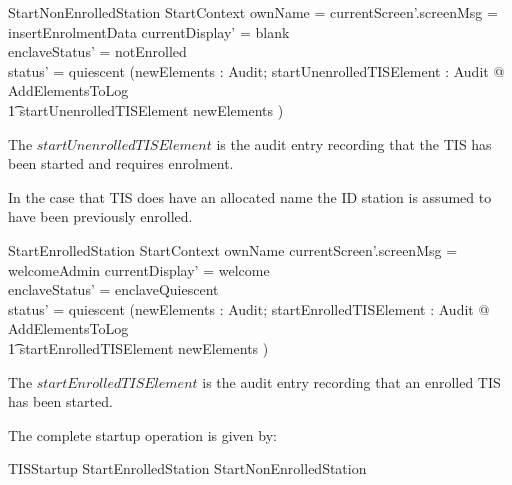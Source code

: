\begin{schema}{StartNonEnrolledStation}
        StartContext
\where 
        ownName = \Nil
\also
        currentScreen'.screenMsg = insertEnrolmentData
\also
	currentDisplay' = blank
\\	enclaveStatus' = notEnrolled
\\      status' = quiescent
\also
        (\exists newElements : \finset Audit;
        startUnenrolledTISElement : Audit @ AddElementsToLog 
\\ \t1  \land startUnenrolledTISElement \in newElements )
\end{schema}
\begin{Zcomment}
\item
The $startUnenrolledTISElement$ is the audit entry recording that the
TIS has been started and requires enrolment. 
\end{Zcomment}

In the case that TIS does have an allocated name the ID station is
assumed to have been previously enrolled.

\begin{schema}{StartEnrolledStation}
        StartContext
\where 
        ownName \neq \Nil
\also
        currentScreen'.screenMsg = welcomeAdmin
\also
	currentDisplay' = welcome
\\	enclaveStatus' = enclaveQuiescent
\\      status' = quiescent
\also
        (\exists newElements : \finset Audit;
        startEnrolledTISElement : Audit @ AddElementsToLog 
\\ \t1  \land startEnrolledTISElement \in newElements )
\end{schema}
\begin{Zcomment}
\item
The $startEnrolledTISElement$ is the audit entry recording that an enrolled
TIS has been started. 
\end{Zcomment}

The complete startup operation is given by:

\begin{zed}
        TISStartup  StartEnrolledStation \lor
        StartNonEnrolledStation
\end{zed}







